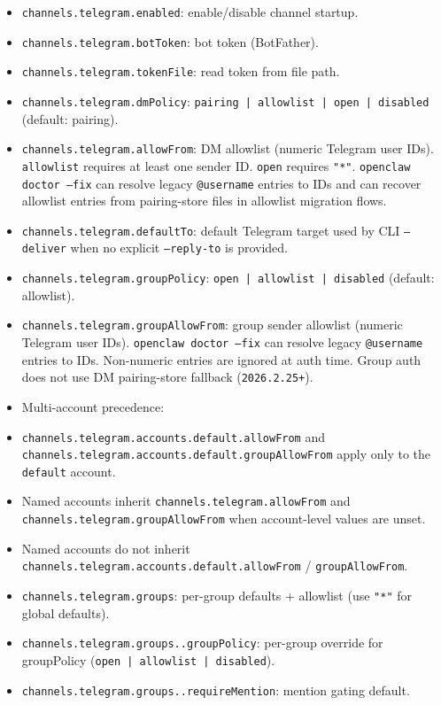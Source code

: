 \begin{itemize}
  \item \texttt{channels.telegram.enabled}: enable/disable channel startup.
  \item \texttt{channels.telegram.botToken}: bot token (BotFather).
  \item \texttt{channels.telegram.tokenFile}: read token from file path.
  \item \texttt{channels.telegram.dmPolicy}: \texttt{pairing | allowlist | open | disabled} (default: pairing).
  \item \texttt{channels.telegram.allowFrom}: DM allowlist (numeric Telegram user IDs). \texttt{allowlist} requires at least one sender ID. \texttt{open} requires \texttt{"*"}. \texttt{openclaw doctor --fix} can resolve legacy \texttt{@username} entries to IDs and can recover allowlist entries from pairing-store files in allowlist migration flows.
  \item \texttt{channels.telegram.defaultTo}: default Telegram target used by CLI \texttt{--deliver} when no explicit \texttt{--reply-to} is provided.
  \item \texttt{channels.telegram.groupPolicy}: \texttt{open | allowlist | disabled} (default: allowlist).
  \item \texttt{channels.telegram.groupAllowFrom}: group sender allowlist (numeric Telegram user IDs). \texttt{openclaw doctor --fix} can resolve legacy \texttt{@username} entries to IDs. Non-numeric entries are ignored at auth time. Group auth does not use DM pairing-store fallback (\texttt{2026.2.25+}).
  \item Multi-account precedence:
  \item \texttt{channels.telegram.accounts.default.allowFrom} and \texttt{channels.telegram.accounts.default.groupAllowFrom} apply only to the \texttt{default} account.
  \item Named accounts inherit \texttt{channels.telegram.allowFrom} and \texttt{channels.telegram.groupAllowFrom} when account-level values are unset.
  \item Named accounts do not inherit \texttt{channels.telegram.accounts.default.allowFrom} / \texttt{groupAllowFrom}.
  \item \texttt{channels.telegram.groups}: per-group defaults + allowlist (use \texttt{"*"} for global defaults).
  \item \texttt{channels.telegram.groups..groupPolicy}: per-group override for groupPolicy (\texttt{open | allowlist | disabled}).
  \item \texttt{channels.telegram.groups..requireMention}: mention gating default.

\end{itemize}
